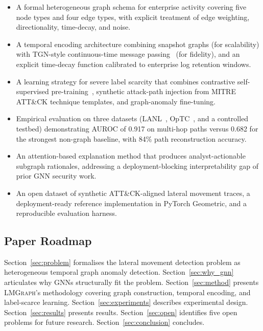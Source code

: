 \documentclass[sigconf,nonacm]{acmart}
\begin{document}
\begin{itemize}
  \item A formal heterogeneous graph schema for enterprise activity covering
        five node types and four edge types, with explicit treatment of edge
        weighting, directionality, time-decay, and noise.
  \item A temporal encoding architecture combining snapshot graphs (for
        scalability) with TGN-style continuous-time message
        passing~\cite{rossi2020tgn} (for fidelity), and an explicit time-decay
        function calibrated to enterprise log retention windows.
  \item A learning strategy for severe label scarcity that combines
        contrastive self-supervised pre-training~\cite{velickovic2019dgi},
        synthetic attack-path injection from MITRE ATT\&CK technique
        templates, and graph-anomaly fine-tuning.
  \item Empirical evaluation on three datasets (LANL~\cite{kent2015lanl},
        OpTC~\cite{darpa2020optc}, and a controlled testbed) demonstrating
        AUROC of 0.917 on multi-hop paths versus 0.682 for the strongest
        non-graph baseline, with 84\% path reconstruction accuracy.
  \item An attention-based explanation method that produces analyst-actionable
        subgraph rationales, addressing a deployment-blocking interpretability
        gap of prior GNN security work.
  \item An open dataset of synthetic ATT\&CK-aligned lateral movement traces,
        a deployment-ready reference implementation in PyTorch Geometric, and
        a reproducible evaluation harness.
\end{itemize}

\subsection{Paper Roadmap}

Section~\ref{sec:problem} formalises the lateral movement detection problem as
heterogeneous temporal graph anomaly detection. Section~\ref{sec:why_gnn}
articulates why GNNs structurally fit the problem. Section~\ref{sec:method}
presents \textsc{LMGraph}'s methodology covering graph construction, temporal
encoding, and label-scarce learning. Section~\ref{sec:experiments} describes
experimental design. Section~\ref{sec:results} presents results.
Section~\ref{sec:open} identifies five open problems for future research.
Section~\ref{sec:conclusion} concludes.
\end{document}
